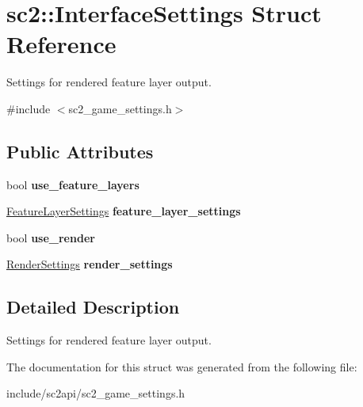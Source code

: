 \hypertarget{structsc2_1_1_interface_settings}{}\section{sc2\+:\+:Interface\+Settings Struct Reference}
\label{structsc2_1_1_interface_settings}


Settings for rendered feature layer output.  




{\ttfamily \#include $<$sc2\+\_\+game\+\_\+settings.\+h$>$}

\subsection*{Public Attributes}
\begin{DoxyCompactItemize}
\item 
\mbox{\label{structsc2_1_1_interface_settings_a0d7076af655db7fc129eb9039d6978c3}} 
bool {\bfseries use\+\_\+feature\+\_\+layers}
\item 
\mbox{\label{structsc2_1_1_interface_settings_ac691f9f76b599b8d9b6948c83f0f2656}} 
\hyperlink{structsc2_1_1_feature_layer_settings}{Feature\+Layer\+Settings} {\bfseries feature\+\_\+layer\+\_\+settings}
\item 
\mbox{\label{structsc2_1_1_interface_settings_a472b919fdb0b514273f8a9d484ff4577}} 
bool {\bfseries use\+\_\+render}
\item 
\mbox{\label{structsc2_1_1_interface_settings_aa8382f813887158fbc918a030c74f9fa}} 
\hyperlink{structsc2_1_1_render_settings}{Render\+Settings} {\bfseries render\+\_\+settings}
\end{DoxyCompactItemize}


\subsection{Detailed Description}
Settings for rendered feature layer output. 

The documentation for this struct was generated from the following file\+:\begin{DoxyCompactItemize}
\item 
include/sc2api/sc2\+\_\+game\+\_\+settings.\+h\end{DoxyCompactItemize}
